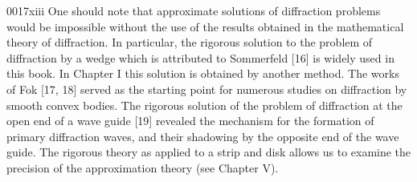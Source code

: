 \begin{scanpage}{0017}{xiii}
One should note that approximate solutions of diffraction problems would be impossible without the use of the results obtained in the mathematical theory of diffraction. In particular, the rigorous solution to the problem of diffraction by a wedge which is attributed to Sommerfeld [16] is widely used in this book. In Chapter I this solution is obtained by another method. The works of Fok [17, 18] served as the starting point for numerous studies on diffraction by smooth convex bodies. The rigorous solution of the problem of diffraction at the open end of a wave guide [19] revealed the mechanism for the formation of primary diffraction waves, and their shadowing by the opposite end of the wave guide. The rigorous theory as applied to a strip and disk allows us to examine the precision of the approximation theory (see Chapter V).
\end{scanpage}
